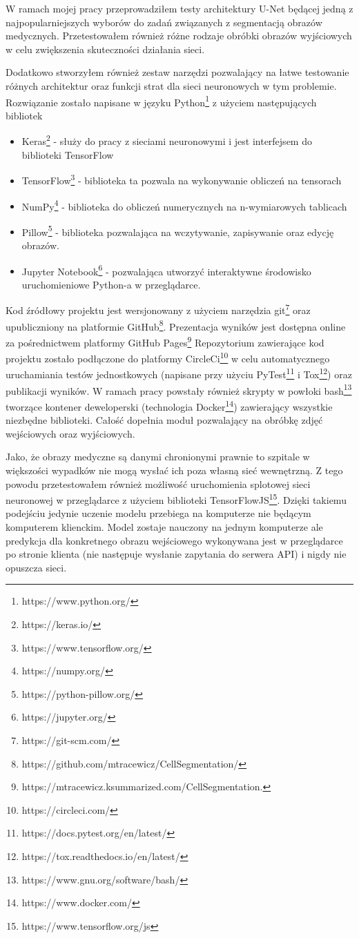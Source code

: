 \documentclass{article}
\begin{document}
W ramach mojej pracy przeprowadziłem testy architektury U-Net będącej jedną z najpopularniejszych wyborów do zadań związanych z segmentacją obrazów medycznych.
Przetestowałem również różne rodzaje obróbki obrazów wyjściowych w celu zwiększenia skuteczności działania sieci.

Dodatkowo stworzyłem również zestaw narzędzi pozwalający na łatwe testowanie różnych architektur oraz funkcji strat dla sieci neuronowych w tym problemie.
Rozwiązanie zostało napisane w języku Python\footnote{https://www.python.org/} z użyciem następujących bibliotek
\begin{itemize}
    \item Keras\footnote{https://keras.io/} - służy do pracy z sieciami neuronowymi i jest interfejsem do biblioteki TensorFlow
    \item TensorFlow\footnote{https://www.tensorflow.org/} - biblioteka ta pozwala na wykonywanie obliczeń na tensorach
    \item NumPy\footnote{https://numpy.org/} - biblioteka do obliczeń numerycznych na n-wymiarowych tablicach
    \item Pillow\footnote{https://python-pillow.org/} - biblioteka pozwalająca na wczytywanie, zapisywanie oraz edycję obrazów.
    \item Jupyter Notebook\footnote{https://jupyter.org/} - pozwalająca utworzyć interaktywne środowisko uruchomieniowe Python-a w przeglądarce.
\end{itemize}
Kod źródłowy projektu jest wersjonowany z użyciem narzędzia git\footnote{https://git-scm.com/} \newline oraz upubliczniony na platformie GitHub\footnote{https://github.com/mtracewicz/CellSegmentation/}.
Prezentacja wyników jest dostępna online za pośrednictwem platformy GitHub Pages\footnote{ https://mtracewicz.ksummarized.com/CellSegmentation.}
Repozytorium zawierające kod projektu zostało podłączone do platformy CircleCi\footnote{https://circleci.com/} w celu automatycznego uruchamiania testów jednostkowych (napisane przy użyciu PyTest\footnote{https://docs.pytest.org/en/latest/} i Tox\footnote{https://tox.readthedocs.io/en/latest/}) oraz publikacji wyników.
W ramach pracy powstały również skrypty w powłoki bash\footnote{https://www.gnu.org/software/bash/} tworzące kontener deweloperski (technologia Docker\footnote{https://www.docker.com/}) zawierający wszystkie niezbędne biblioteki.
Całość dopełnia moduł pozwalający na obróbkę zdjęć wejściowych oraz wyjściowych.

Jako, że obrazy medyczne są danymi chronionymi prawnie to szpitale w większości wypadków nie mogą wysłać ich poza własną sieć wewnętrzną.
Z tego powodu przetestowałem również możliwość uruchomienia splotowej sieci neuronowej w przeglądarce z użyciem biblioteki TensorFlowJS\footnote{https://www.tensorflow.org/js}.
Dzięki takiemu podejściu jedynie uczenie modelu przebiega na komputerze nie będącym komputerem klienckim.
Model zostaje nauczony na jednym komputerze ale predykcja dla konkretnego obrazu wejściowego wykonywana jest w przeglądarce po stronie klienta (nie następuje wysłanie zapytania do serwera API) i nigdy nie opuszcza sieci.
\end{document}
